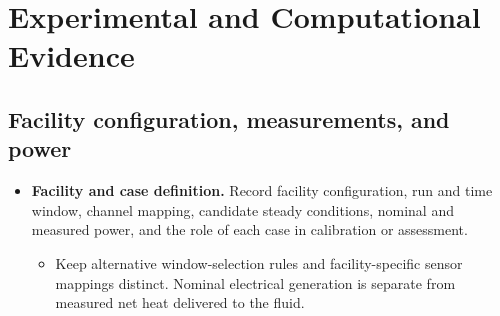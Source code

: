 \section{Experimental and Computational Evidence}\label{sec:experimental-and-computational-evidence}

\subsection{Facility configuration, measurements, and power}\label{subsec:facility-configuration-measurements-and-power}
\begin{itemize}[leftmargin=*]
\item {}\textbf{Facility and case definition.} Record facility configuration, run and time window, channel mapping, candidate steady conditions, nominal and measured power, and the role of each case in calibration or assessment.
\begin{itemize}
\item Keep alternative window-selection rules and facility-specific sensor mappings distinct. Nominal electrical generation is separate from measured net heat delivered to the fluid.
\end{itemize}


\end{itemize}
